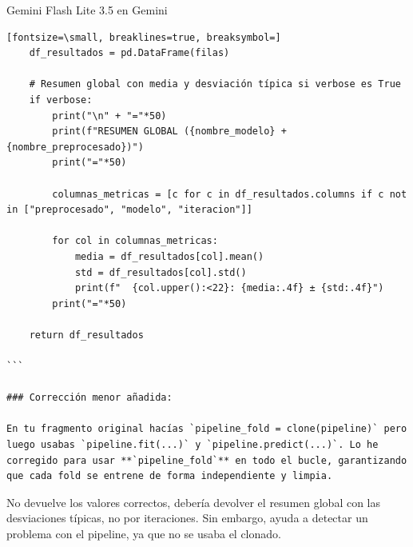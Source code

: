 \documentclass[12pt,a4paper,oneside]{book}
\begin{document}
\begin{iaresp}{Gemini Flash Lite 3.5 en Gemini}
\begin{Verbatim}[fontsize=\small, breaklines=true, breaksymbol=]
    df_resultados = pd.DataFrame(filas)
    
    # Resumen global con media y desviación típica si verbose es True
    if verbose:
        print("\n" + "="*50)
        print(f"RESUMEN GLOBAL ({nombre_modelo} + {nombre_preprocesado})")
        print("="*50)
        
        columnas_metricas = [c for c in df_resultados.columns if c not in ["preprocesado", "modelo", "iteracion"]]
        
        for col in columnas_metricas:
            media = df_resultados[col].mean()
            std = df_resultados[col].std()
            print(f"  {col.upper():<22}: {media:.4f} ± {std:.4f}")
        print("="*50)
        
    return df_resultados

```

### Corrección menor añadida:

En tu fragmento original hacías `pipeline_fold = clone(pipeline)` pero luego usabas `pipeline.fit(...)` y `pipeline.predict(...)`. Lo he corregido para usar **`pipeline_fold`** en todo el bucle, garantizando que cada fold se entrene de forma independiente y limpia.
\end{Verbatim}
\end{iaresp}
\begin{iaanalisis}
No devuelve los valores correctos, debería devolver el resumen global con las desviaciones típicas, no por iteraciones. Sin embargo, ayuda a detectar un problema con el pipeline, ya que no se usaba el clonado.
\end{iaanalisis}
\end{document}
